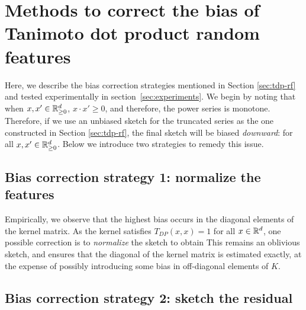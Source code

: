 \section{Methods to correct the bias of Tanimoto dot product random features}
\label{apdx:bias-correction}

Here, we describe the bias correction strategies mentioned in Section \ref{sec:tdp-rf} and tested experimentally in section~\ref{sec:experiments}.
We begin by noting that when $x,x'\in\mathbb{R}_{\ge 0}^d$, $x\cdot x'\ge 0$, and therefore, the power series
is monotone. Therefore, if we use an unbiased sketch for the truncated series 
as the one constructed in Section \ref{sec:tdp-rf}, the final sketch will be biased \emph{downward}:
for all $x,x'\in\mathbb{R}_{\ge 0}^d$. Below we introduce two strategies to remedy this issue.

\subsection{Bias correction strategy 1: normalize the features}

Empirically, we observe that the highest bias occurs in the diagonal elements of the kernel matrix. As the kernel satisfies $T_{DP}(x,x)=1$ for all $x\in\mathbb{R}^d$, one possible correction is to \emph{normalize} the sketch to obtain
This remains an oblivious sketch, and ensures that the diagonal of the kernel matrix is estimated exactly, at the expense of possibly introducing some bias in off-diagonal elements of $K$.

\subsection{Bias correction strategy 2: sketch the residual}

